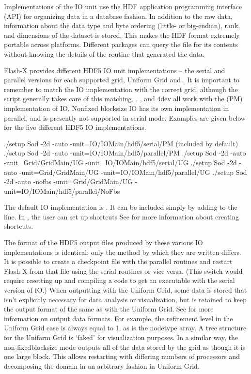 Implementations of the %
\unit{IO} unit use the
HDF application programming interface (API) for organizing data in a
database fashion.  In addition to the raw data, information about the
data type and byte ordering (little- or big-endian), rank, and
dimensions of the dataset is stored.  This makes the HDF format
extremely portable across platforms.  Different packages can query the
file for its contents without knowing the details of the routine that
generated the data.



Flash-X provides different HDF5 IO unit implementations -- the serial
and parallel versions for each supported grid, Uniform Grid and
\Paramesh. It is important to remember to match the IO
implementation with the correct grid, although the  script generally
takes care of this matching.   , , and \Paramesh4dev all work
with the \Paramesh (PM) implementation of IO.  Nonfixed blocksize IO has 
its own implementation in parallel, and is presently not supported in serial
mode.
Examples are given below for the five different HDF5 IO implementations.

\begin{codeseg}
./setup Sod -2d -auto -unit=IO/IOMain/hdf5/serial/PM (included by default)
./setup Sod -2d -auto -unit=IO/IOMain/hdf5/parallel/PM
./setup Sod -2d -auto -unit=Grid/GridMain/UG -unit=IO/IOMain/hdf5/serial/UG
./setup Sod -2d -auto -unit=Grid/GridMain/UG -unit=IO/IOMain/hdf5/parallel/UG
./setup Sod -2d -auto -nofbs -unit=Grid/GridMain/UG -unit=IO/IOMain/hdf5/parallel/NoFbs
\end{codeseg}

The default IO implementation is .
It can be included simply by adding  to the 
line.  In \flashx, the user can set up
shortcuts%
See
 for
more information about creating shortcuts.


The format of the HDF5 output files produced by these various IO
implementations is identical; only the method by which they are
written differs.  It is possible to create a checkpoint file with the
parallel routines and restart Flash-X from that file using the serial
routines or vice-versa.  (This switch would require resetting up and compiling a code to
get an executable with the serial version of IO.)
When outputting with the Uniform Grid, some
data is stored that isn't explicitly necessary for data analysis or
visualization, but is retained to keep the output format of \Paramesh
the same as with the Uniform Grid.  See  for
more information on output data formats.  For example, the refinement
level in the Uniform Grid case is always equal to 1, as is the
nodetype array.  A tree structure for the Uniform Grid is `faked' for visualization purposes.
In a similar way, the non-fixedblocksize mode outputs all of the data stored by the grid as 
though it is one large block.  This allows restarting with differing numbers of processors
and decomposing the domain in an arbitrary fashion in Uniform Grid.

